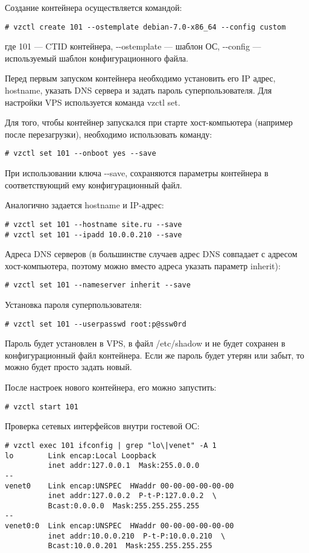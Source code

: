 Создание контейнера осуществляется командой:
\begin{lstlisting}
# vzctl create 101 --ostemplate debian-7.0-x86_64 --config custom
\end{lstlisting}
где 101 --- CTID контейнера, -{}-ostemplate --- шаблон ОС, -{}-config --- используемый шаблон конфигурационного файла.

Перед первым запуском контейнера необходимо установить его IP адрес, hostname, указать DNS сервера и задать пароль суперпользователя.
Для настройки VPS используется команда vzctl set.

Для того, чтобы контейнер запускался при старте хост-компьютера (например после перезагрузки), необходимо использовать команду:
\begin{lstlisting}
# vzctl set 101 --onboot yes --save
\end{lstlisting}

При использовании ключа -{}-save, сохраняются параметры контейнера в соответствующий ему конфигурационный файл.

Аналогично задается hostname и IP-адрес:
\begin{lstlisting}
# vzctl set 101 --hostname site.ru --save
# vzctl set 101 --ipadd 10.0.0.210 --save
\end{lstlisting}

Адреса DNS серверов (в большинстве случаев адрес DNS совпадает с адресом хост-компьютера, поэтому можно вместо адреса указать параметр inherit):
\begin{lstlisting}
# vzctl set 101 --nameserver inherit --save
\end{lstlisting}

Установка пароля суперпользователя:
\begin{lstlisting}
# vzctl set 101 --userpasswd root:p@ssw0rd
\end{lstlisting}

Пароль будет установлен в VPS, в файл /etc/shadow и не будет сохранен в конфигурационный файл контейнера.
Если же пароль будет утерян или забыт, то можно будет просто задать новый.

После настроек нового контейнера, его можно запустить:
\begin{lstlisting}
# vzctl start 101
\end{lstlisting}

Проверка сетевых интерфейсов внутри гостевой ОС:
\begin{lstlisting}
# vzctl exec 101 ifconfig | grep "lo\|venet" -A 1
lo        Link encap:Local Loopback
          inet addr:127.0.0.1  Mask:255.0.0.0
--
venet0    Link encap:UNSPEC  HWaddr 00-00-00-00-00-00
          inet addr:127.0.0.2  P-t-P:127.0.0.2  \
          Bcast:0.0.0.0  Mask:255.255.255.255
--
venet0:0  Link encap:UNSPEC  HWaddr 00-00-00-00-00-00
          inet addr:10.0.0.210  P-t-P:10.0.0.210  \
          Bcast:10.0.0.201  Mask:255.255.255.255
\end{lstlisting}


